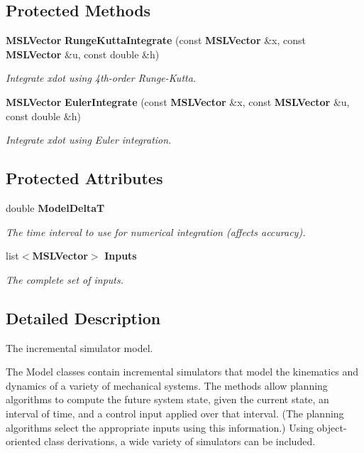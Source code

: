 \subsection*{Protected Methods}
\begin{CompactItemize}
\item 
{\bf MSLVector} {\bf Runge\-Kutta\-Integrate} (const {\bf MSLVector} \&x, const {\bf MSLVector} \&u, const double \&h)
\begin{CompactList}\small\item\em Integrate xdot using 4th-order Runge-Kutta.\item\end{CompactList}\item 
{\bf MSLVector} {\bf Euler\-Integrate} (const {\bf MSLVector} \&x, const {\bf MSLVector} \&u, const double \&h)
\begin{CompactList}\small\item\em Integrate xdot using Euler integration.\item\end{CompactList}\end{CompactItemize}
\subsection*{Protected Attributes}
\begin{CompactItemize}
\item 
double {\bf Model\-Delta\-T}
\begin{CompactList}\small\item\em The time interval to use for numerical integration (affects accuracy).\item\end{CompactList}\item 
list$<${\bf MSLVector}$>$ {\bf Inputs}
\begin{CompactList}\small\item\em The complete set of inputs.\item\end{CompactList}\end{CompactItemize}


\subsection{Detailed Description}
The incremental simulator model.

The Model classes contain incremental simulators that model the kinematics and dynamics of a variety of mechanical systems. The methods allow planning algorithms to compute the future system state, given the current state, an interval of time, and a control input applied over that interval. (The planning algorithms select the appropriate inputs using this information.) Using object-oriented class derivations, a wide variety of simulators can be included. 



